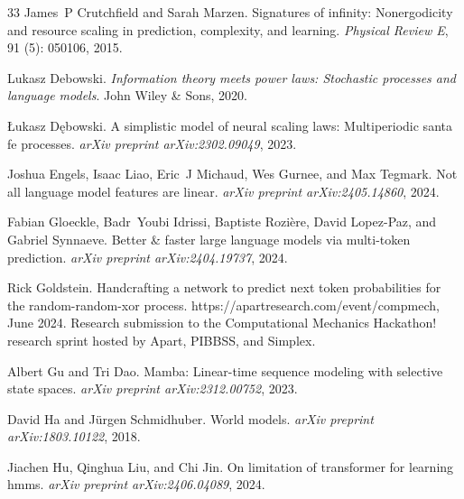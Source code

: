 \documentclass{article}
\begin{document}
\begin{thebibliography}{33}
James~P Crutchfield and Sarah Marzen.
\newblock Signatures of infinity: Nonergodicity and resource scaling in prediction, complexity, and learning.
\newblock \emph{Physical Review E}, 91 (5): 050106, 2015.

Lukasz Debowski.
\newblock \emph{Information theory meets power laws: Stochastic processes and language models}.
\newblock John Wiley \& Sons, 2020.

{\L}ukasz D{\k{e}}bowski.
\newblock A simplistic model of neural scaling laws: Multiperiodic santa fe processes.
\newblock \emph{arXiv preprint arXiv:2302.09049}, 2023.

Joshua Engels, Isaac Liao, Eric~J Michaud, Wes Gurnee, and Max Tegmark.
\newblock Not all language model features are linear.
\newblock \emph{arXiv preprint arXiv:2405.14860}, 2024.

Fabian Gloeckle, Badr~Youbi Idrissi, Baptiste Rozi{\`e}re, David Lopez-Paz, and Gabriel Synnaeve.
\newblock Better \& faster large language models via multi-token prediction.
\newblock \emph{arXiv preprint arXiv:2404.19737}, 2024.

Rick Goldstein.
\newblock Handcrafting a network to predict next token probabilities for the random-random-xor process.
\newblock https://apartresearch.com/event/compmech, June 2024.
\newblock Research submission to the Computational Mechanics Hackathon! research sprint hosted by Apart, PIBBSS, and Simplex.

Albert Gu and Tri Dao.
\newblock Mamba: Linear-time sequence modeling with selective state spaces.
\newblock \emph{arXiv preprint arXiv:2312.00752}, 2023.

David Ha and J{\"u}rgen Schmidhuber.
\newblock World models.
\newblock \emph{arXiv preprint arXiv:1803.10122}, 2018.

Jiachen Hu, Qinghua Liu, and Chi Jin.
\newblock On limitation of transformer for learning hmms.
\newblock \emph{arXiv preprint arXiv:2406.04089}, 2024.


\end{thebibliography}
\end{document}
